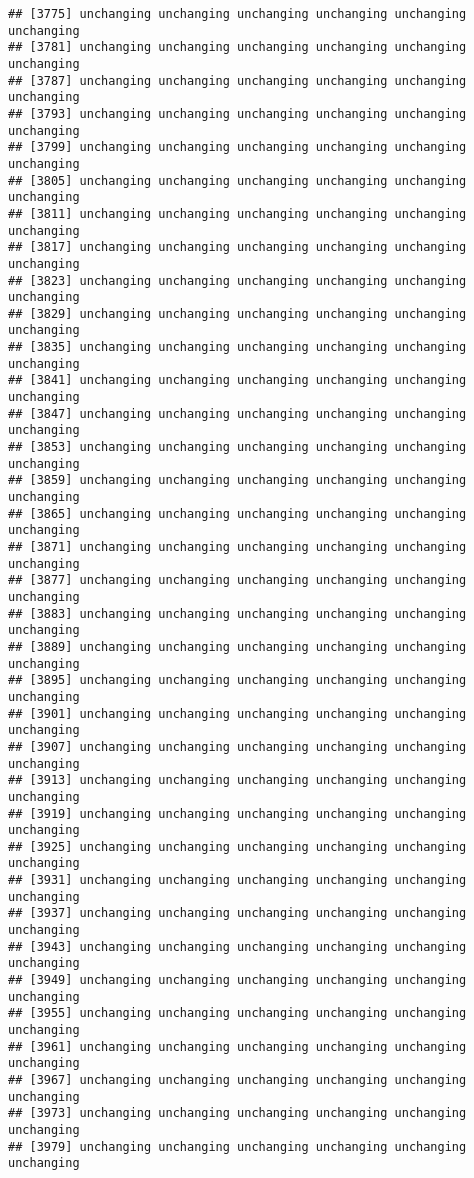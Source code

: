 \documentclass[]{article}
\begin{document}
\begin{verbatim}
## [3775] unchanging unchanging unchanging unchanging unchanging unchanging
## [3781] unchanging unchanging unchanging unchanging unchanging unchanging
## [3787] unchanging unchanging unchanging unchanging unchanging unchanging
## [3793] unchanging unchanging unchanging unchanging unchanging unchanging
## [3799] unchanging unchanging unchanging unchanging unchanging unchanging
## [3805] unchanging unchanging unchanging unchanging unchanging unchanging
## [3811] unchanging unchanging unchanging unchanging unchanging unchanging
## [3817] unchanging unchanging unchanging unchanging unchanging unchanging
## [3823] unchanging unchanging unchanging unchanging unchanging unchanging
## [3829] unchanging unchanging unchanging unchanging unchanging unchanging
## [3835] unchanging unchanging unchanging unchanging unchanging unchanging
## [3841] unchanging unchanging unchanging unchanging unchanging unchanging
## [3847] unchanging unchanging unchanging unchanging unchanging unchanging
## [3853] unchanging unchanging unchanging unchanging unchanging unchanging
## [3859] unchanging unchanging unchanging unchanging unchanging unchanging
## [3865] unchanging unchanging unchanging unchanging unchanging unchanging
## [3871] unchanging unchanging unchanging unchanging unchanging unchanging
## [3877] unchanging unchanging unchanging unchanging unchanging unchanging
## [3883] unchanging unchanging unchanging unchanging unchanging unchanging
## [3889] unchanging unchanging unchanging unchanging unchanging unchanging
## [3895] unchanging unchanging unchanging unchanging unchanging unchanging
## [3901] unchanging unchanging unchanging unchanging unchanging unchanging
## [3907] unchanging unchanging unchanging unchanging unchanging unchanging
## [3913] unchanging unchanging unchanging unchanging unchanging unchanging
## [3919] unchanging unchanging unchanging unchanging unchanging unchanging
## [3925] unchanging unchanging unchanging unchanging unchanging unchanging
## [3931] unchanging unchanging unchanging unchanging unchanging unchanging
## [3937] unchanging unchanging unchanging unchanging unchanging unchanging
## [3943] unchanging unchanging unchanging unchanging unchanging unchanging
## [3949] unchanging unchanging unchanging unchanging unchanging unchanging
## [3955] unchanging unchanging unchanging unchanging unchanging unchanging
## [3961] unchanging unchanging unchanging unchanging unchanging unchanging
## [3967] unchanging unchanging unchanging unchanging unchanging unchanging
## [3973] unchanging unchanging unchanging unchanging unchanging unchanging
## [3979] unchanging unchanging unchanging unchanging unchanging unchanging

\end{verbatim}
\end{document}
